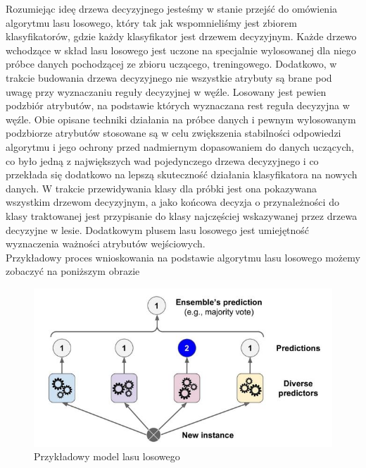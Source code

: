 Rozumiejąc ideę drzewa decyzyjnego jesteśmy w stanie przejść do omówienia algorytmu lasu losowego, który tak jak wspomnieliśmy jest zbiorem klasyfikatorów, gdzie każdy klasyfikator jest drzewem decyzyjnym. Każde drzewo wchodzące w skład lasu losowego jest uczone na specjalnie wylosowanej dla niego próbce danych pochodzącej ze zbioru uczącego, treningowego. Dodatkowo, w trakcie budowania drzewa decyzyjnego nie wszystkie atrybuty są brane pod uwagę przy wyznaczaniu reguły decyzyjnej w węźle. Losowany jest pewien podzbiór atrybutów, na podstawie których wyznaczana rest reguła decyzyjna w węźle. Obie opisane techniki działania na próbce danych i pewnym wylosowanym podzbiorze atrybutów stosowane są w celu zwiększenia stabilności odpowiedzi algorytmu i jego ochrony przed nadmiernym dopasowaniem do danych uczących, co było jedną z największych wad pojedynczego drzewa decyzyjnego i co przekłada się dodatkowo na lepszą skuteczność działania klasyfikatora na nowych danych. W trakcie przewidywania klasy dla próbki jest ona pokazywana wszystkim drzewom decyzyjnym, a jako końcowa decyzja o przynależności do klasy traktowanej jest przypisanie do klasy najczęściej wskazywanej przez drzewa decyzyjne w lesie. Dodatkowym plusem lasu losowego jest umiejętność wyznaczenia ważności atrybutów wejściowych. \cite{PPlonski}\\

Przykładowy proces wnioskowania na podstawie algorytmu lasu losowego możemy zobaczyć na poniższym obrazie
\begin{figure}[h] 
        \centering\includegraphics[width=14cm]{figures/randomForestModel.JPG}
        \caption{Przykładowy model lasu losowego}
\end{figure}

\newpage

